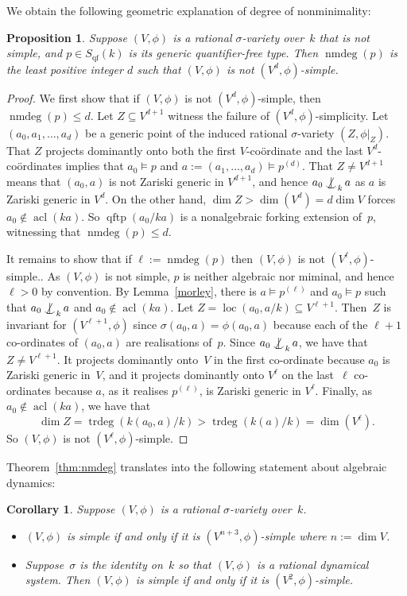 \documentclass[\DocOpts]{amsart}
\newtheorem{corollary}[theorem]{Corollary}
\newtheorem{proposition}[theorem]{Proposition}
\theoremstyle{definition}
\def\qftp{\operatorname{qftp}}
\def\qf{\operatorname{qf}}
\def\acl{\operatorname{acl}}
\def\loc{\operatorname{loc}}
\def\trdeg{\operatorname{trdeg}}
\def\nmdeg{\operatorname{nmdeg}}
\newcommand{\<}{\langle}
\renewcommand{\>}{\rangle}
\def\notind#1#2{#1\setbox0=\hbox{\(#1x\)}\kern\wd0\hbox to 
0pt{\mathchardef\nn=12854\hss\(#1\nn\)\kern1.4\wd0\hss}\hbox to 
0pt{\hss\(#1\mid\)\hss}\lower.9\ht0 \hbox to 
0pt{\hss\(#1\smile\)\hss}\kern\wd0}
\def\nind{\mathop{\mathpalette\notind{}}}
\begin{document}
We obtain the following geometric explanation of degree of nonminimality:

\begin{proposition}
\label{prop:nmdeg-geom}
Suppose $(V,\phi)$ is a rational $\sigma$-variety over~$k$ that is not simple, and $p\in S_{\qf}(k)$ is its generic quantifier-free type.
Then $\nmdeg(p)$ is the least positive integer $d$ such that $(V,\phi)$ is not $(V^d,\phi)$-simple.
\end{proposition}

\begin{proof}
We first show that if $(V,\phi)$ is not $(V^d,\phi)$-simple, then $\nmdeg(p)\leq d$.
Let $Z\subseteq V^{d+1}$ witness the failure of $(V^d,\phi)$-simplicity.
Let $(a_0,a_1,\dots,a_d)$ be a generic point of the induced rational $\sigma$-variety $(Z,\phi|_Z)$.
That $Z$ projects dominantly onto both the first $V$-co\"ordinate and the last $V^d$-co\"ordinates implies that $a_0\models p$ and $a:=(a_1,\dots,a_d)\models p^{(d)}$.
That $Z\neq V^{d+1}$ means that $(a_0,a)$ is not Zariski generic in $V^{d+1}$, and hence $a_0\nind_ka$ as $a$ is Zariski generic in $V^d$.
On the other hand, $\dim Z>\dim(V^d)=d\dim V$ forces $a_0\notin\acl(ka)$.
So $\qftp(a_0/ka)$ is a nonalgebraic forking extension of~$p$, witnessing that $\nmdeg(p)\leq d$.

It remains to show that if $\ell:=\nmdeg(p)$ then $(V,\phi)$ is not $(V^\ell,\phi)$-simple..
As $(V,\phi)$ is not simple, $p$ is neither algebraic nor miminal, and hence $\ell>0$ by convention.
By Lemma~\ref{morley}, there is $a\models p^{(\ell)}$ and $a_0\models p$ such that $a_0\nind_ka$ and $a_0\notin\acl(ka)$.
Let $Z=\loc(a_0,a/k)\subseteq V^{\ell+1}$.
Then~$Z$ is invariant for $(V^{\ell+1},\phi)$ since $\sigma(a_0,a)=\phi(a_0,a)$ because each of the $\ell+1$ co-ordinates of $(a_0,a)$ are realisations of~$p$.
Since $a_0\nind_ka$, we have that $Z\neq V^{\ell+1}$.
It projects dominantly onto~$V$ in the first co-ordinate because $a_0$ is Zariski generic in~$V$, and it projects dominantly onto $V^\ell$ on the last~$\ell$ co-ordinates because $a$, as it realises $p^{(\ell)}$, is Zariski generic in $V^\ell$.
Finally, as $a_0\notin\acl(ka)$, we have that
$$\dim Z=\trdeg(k(a_0,a)/k)>\trdeg(k(a)/k)=\dim(V^\ell).$$
So $(V,\phi)$ is not $(V^\ell,\phi)$-simple.
\end{proof}

Theorem~\ref{thm:nmdeg} translates into the following statement about algebraic dynamics:

\begin{corollary}
\label{cor:nmdeg-geom}
Suppose $(V,\phi)$ is a rational $\sigma$-variety over~$k$.
\begin{itemize}
\item[(a)]
$(V,\phi)$ is simple if and only if it is $(V^{n+3},\phi)$-simple where $n:=\dim V$.
\item[(b)]
Suppose~$\sigma$ is the identity on~$k$ so that $(V,\phi)$ is a rational dynamical system.
Then $(V,\phi)$ is simple if and only if it is $(V^{2},\phi)$-simple.
\end{itemize}
\end{corollary}
\end{document}
